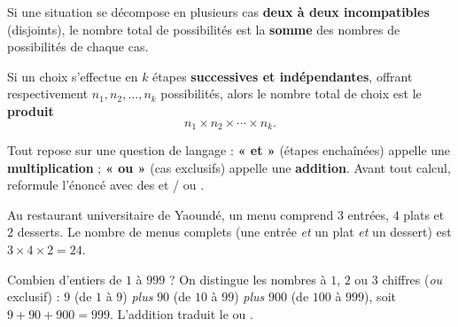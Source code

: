 \begin{theoreme}
Si une situation se décompose en plusieurs cas \textbf{deux à deux incompatibles} (disjoints), le nombre total de possibilités est la \textbf{somme} des nombres de possibilités de chaque cas.
\end{theoreme}

\begin{theoreme}
Si un choix s'effectue en $k$ étapes \textbf{successives et indépendantes}, offrant respectivement $n_1, n_2, \dots, n_k$ possibilités, alors le nombre total de choix est le \textbf{produit}
\[
n_1\times n_2\times \cdots \times n_k.
\]
\end{theoreme}

\begin{aretenir}
Tout repose sur une question de langage : \textbf{« et »} (étapes enchaînées) appelle une \textbf{multiplication} ; \textbf{« ou »} (cas exclusifs) appelle une \textbf{addition}. Avant tout calcul, reformule l'énoncé avec des \og et \fg{} / \og ou \fg.
\end{aretenir}

\begin{exemple}
Au restaurant universitaire de Yaoundé, un menu comprend $3$ entrées, $4$ plats et $2$ desserts. Le nombre de menus complets (une entrée \emph{et} un plat \emph{et} un dessert) est $3\times 4\times 2=24$.
\end{exemple}

\begin{exemple}
Combien d'entiers de $1$ à $999$ ? On distingue les nombres à $1$, $2$ ou $3$ chiffres
(\emph{ou} exclusif) : $9$ (de $1$ à $9$) \emph{plus} $90$ (de $10$ à $99$) \emph{plus}
$900$ (de $100$ à $999$), soit $9+90+900=999$. L'addition traduit le \og ou \fg.
\end{exemple}

\begin{illus}
\end{illus}

